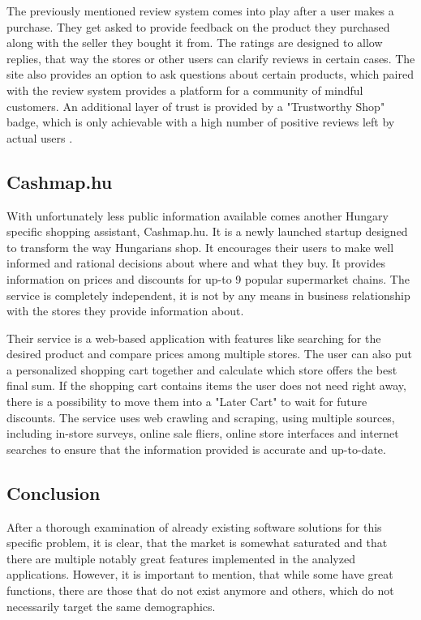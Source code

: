 The previously mentioned review system comes into play after a user makes a purchase. They get asked to provide feedback on the product they purchased along with the seller they bought it from. The ratings are designed to allow replies, that way the stores or other users can clarify reviews in certain cases. The site also provides an option to ask questions about certain products, which paired with the review system provides a platform for a community of mindful customers. An additional layer of trust is provided by a "Trustworthy Shop" badge, which is only achievable with a high number of positive reviews left by actual users \cite{arukereso}. 

\subsection{Cashmap.hu}

With unfortunately less public information available comes another Hungary specific shopping assistant, Cashmap.hu. It is a newly launched startup designed to transform the way Hungarians shop. It encourages their users to make well informed and rational decisions about where and what they buy. It provides information on prices and discounts for up-to 9 popular supermarket chains. The service is completely independent, it is not by any means in business relationship with the stores they provide information about. \cite{maradokapenzemnel2021}

Their service is a web-based application with features like searching for the desired product and compare prices among multiple stores. The user can also put a personalized shopping cart together and calculate which store offers the best final sum. If the shopping cart contains items the user does not need right away, there is a possibility to move them into a "Later Cart" to wait for future discounts. The service uses web crawling and scraping, using multiple sources, including in-store surveys, online sale fliers, online store interfaces and internet searches to ensure that the information provided is accurate and up-to-date. \cite{maradokapenzemnel2021}

\subsection{Conclusion}

After a thorough examination of already existing software solutions for this specific problem, it is clear, that the market is somewhat saturated and that there are multiple notably great features implemented in the analyzed applications. However, it is important to mention, that while some have great functions, there are those that do not exist anymore and others, which do not necessarily target the same demographics. 

